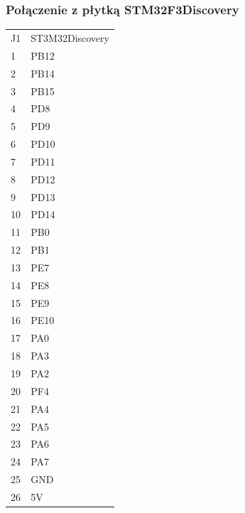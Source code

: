 ﻿\documentclass{article}
\begin{document}
\subsubsection{Połączenie z płytką STM32F3Discovery}
\begin{table}
	\centering
	\label{Bill of materials}
\begin{tabular}{ll}
J1		&	ST3M32Discovery	\\
1		&	PB12		\\
2		&	PB14		\\
3		&	PB15		\\
4		&	PD8		\\
5		&	PD9		\\
6		&	PD10		\\
7		&	PD11		\\
8		&	PD12		\\
9		&	PD13		\\
10		&	PD14		\\

11		&	PB0		\\
12		&	PB1		\\
13		&	PE7		\\
14		&	PE8		\\
15		&	PE9		\\
16		&	PE10		\\

17		&	PA0		\\
18		&	PA3		\\
19		&	PA2		\\
20		&	PF4		\\
21		&	PA4		\\
22		&	PA5		\\
23		&	PA6		\\
24		&	PA7		\\

25		&	GND		\\
26		&	5V		\\
\end{tabular}
\end{table}
\end{document}
